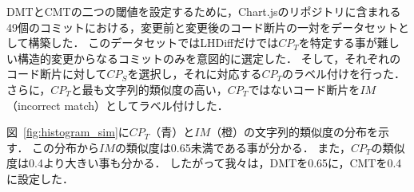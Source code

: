 DMTとCMTの二つの閾値を設定するために，Chart.jsのリポジトリに含まれる49個のコミットにおける，変更前と変更後のコード断片の一対をデータセットとして構築した．
このデータセットではLHDiffだけでは$CP_{T}$を特定する事が難しい構造的変更からなるコミットのみを意図的に選定した．
そして，それぞれのコード断片に対して$CP_S$を選択し，それに対応する$CP_T$のラベル付けを行った．
さらに，$CP_T$と最も文字列的類似度の高い，$CP_T$ではないコード断片を$IM$（incorrect match）としてラベル付けした．



図~\ref{fig:histogram_sim}に$CP_T$（青）と$IM$（橙）の文字列的類似度の分布を示す．
この分布から$IM$の類似度は0.65未満である事が分かる．
また，$CP_T$の類似度は0.4より大きい事も分かる．
したがって我々は，DMTを0.65に，CMTを0.4に設定した．





